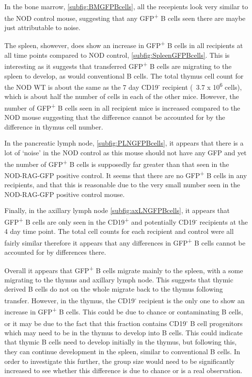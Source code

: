 In the bone marrow, \cref{subfig:BMGFPBcells}, all the recepients look very similar to the NOD control mouse, suggesting that any GFP\textsuperscript{+} B cells seen there are maybe just attributable to noise.

The spleen, showever, does show an increase in GFP\textsuperscript{+} B cells in all recipients at all time points compared to NOD control, \cref{subfig:SpleenGFPBcells}. 
This is interesting as it suggests that transferred GFP\textsuperscript{+} B cells are migrating to the spleen to develop, as would conventional B cells.
The total thymus cell count for the NOD WT is about the same as the 7 day CD19\textsuperscript{-} recipient (~3.7 x 10\textsuperscript{6} cells), which is about half the number of cells in each of the other mice.
However, the number of GFP\textsuperscript{+} B cells seen in all recipient mice is increased compared to the NOD mouse suggesting that the difference cannot be accounted for by the difference in thymus cell number.

In the pancreatic lymph node, \cref{subfig:PLNGFPBcells}, it appears that there is a lot of `noise' in the NOD control as this mouse should not have any GFP and yet the number of GFP\textsuperscript{+} B cells is supposedly far greater than that seen in the NOD-RAG-GFP positive control. 
It seems that there are no GFP\textsuperscript{+} B cells in any recipients, and that this is reasonable due to the very small number seen in the NOD-RAG-GFP positive control mouse.

Finally, in the axillary lymph node \cref{subfig:axLNGFPBcells}, it appears that GFP\textsuperscript{+} B cells are only seen in the CD19\textsuperscript{+} and potentially CD19\textsuperscript{-} recipients at the 4 day time point.
The total cell counts for each recipient and control were all fairly similar therefore it appears that any differences in GFP\textsuperscript{+} B cells cannot be accounted for by differences there.

Overall it appears that GFP\textsuperscript{+} B cells migrate mainly to the spleen, with a some migrating to the thymus and axillary lymph node.
This suggests that thymic derived B cells do not on the whole migrate back to the thymus following transfer.
However, in the thymus, the CD19\textsuperscript{-} recipient is the only one to show an increase in GFP\textsuperscript{+} B cells. 
This could be due to chance or contaminating B cells, or it may be due to the fact that this fraction contains CD19\textsuperscript{-} B cell progenitors which may need to be in the thymus to develop into B cells.
This could indicate that thymic B cells need to develop initially in the thymus, but following this, they can continue development in the spleen, similar to conventional B cells.
In order to investigate this further, the group size would need to be significantly increased to see whether this difference is due to chance or is a real observation.



